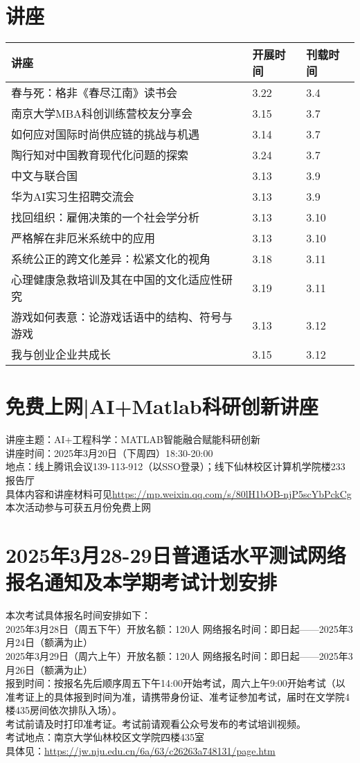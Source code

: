 \documentclass[letterpaper, 12pt]{article}
\begin{document}
\begin{multicols}{2}
\pagebreak
\section{讲座}
\begin{tabular}{|>{\centering\arraybackslash}m{}|m{}|m{}|}
    \hline
    讲座 & 开展时间 & 刊载时间\\
    \hline\hline
    春与死：格非《春尽江南》读书会 & 3.22 & 3.4\\\hline
    南京大学MBA科创训练营校友分享会 & 3.15 & 3.7\\\hline
    如何应对国际时尚供应链的挑战与机遇 & 3.14 & 3.7\\\hline
    陶行知对中国教育现代化问题的探索 & 3.24 & 3.7\\\hline
    中文与联合国 & 3.13 & 3.9\\\hline
    华为AI实习生招聘交流会 & 3.13 & 3.9\\\hline
    找回组织：雇佣决策的一个社会学分析 & 3.13 & 3.10\\\hline
    严格解在非厄米系统中的应用 & 3.13 & 3.10\\\hline
    系统公正的跨文化差异：松紧文化的视角 & 3.18 & 3.11\\\hline
    心理健康急救培训及其在中国的文化适应性研究 & 3.19 & 3.11\\\hline
    游戏如何表意：论游戏话语中的结构、符号与游戏 & 3.13 & 3.12\\\hline
    我与创业企业共成长 & 3.15 & 3.12\\\hline
\end{tabular}
\section{免费上网|AI+Matlab科研创新讲座}
讲座主题：AI+工程科学：MATLAB智能融合赋能科研创新\\
讲座时间：2025年3月20日（下周四）18:30-20:00\\
地点：线上腾讯会议139-113-912（以SSO登录）；线下仙林校区计算机学院楼233报告厅\\
具体内容和讲座材料可见\url{https://mp.weixin.qq.com/s/80lH1bOB-njP5scYbPckCg}\\
本次活动参与可获五月份免费上网
\section{2025年3月28-29日普通话水平测试网络报名通知及本学期考试计划安排}
本次考试具体报名时间安排如下：\\
2025年3月28日（周五下午）开放名额：120人 网络报名时间：即日起——2025年3月24日（额满为止）\\
2025年3月29日（周六上午）开放名额：120人 网络报名时间：即日起——2025年3月26日（额满为止）\\
报到时间：按报名先后顺序周五下午14:00开始考试，周六上午9:00开始考试（以准考证上的具体报到时间为准，请携带身份证、准考证参加考试，届时在文学院4楼435房间依次排队入场）。 \\
考试前请及时打印准考证。考试前请观看公众号发布的考试培训视频。\\
考试地点：南京大学仙林校区文学院四楼435室\\
具体见：\url{https://jw.nju.edu.cn/6a/63/c26263a748131/page.htm}

\end{multicols}
\end{document}
